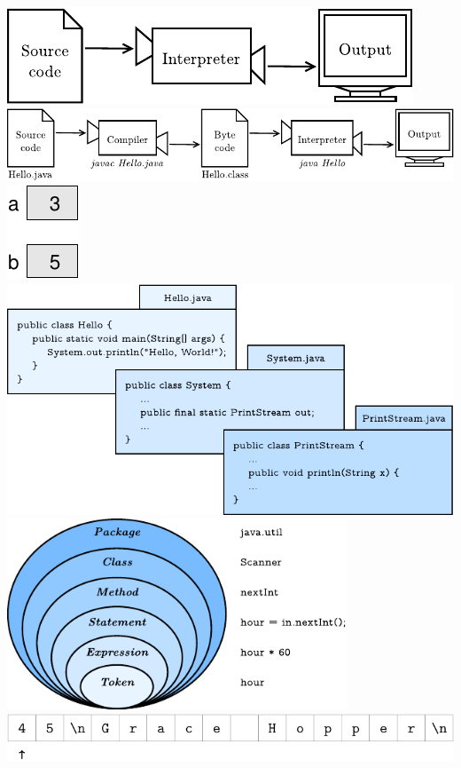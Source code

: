 \documentclass[12pt]{book}
\begin{document}
\includegraphics{./figs/interpreter.pdf}
\clearpage%
\includegraphics{./figs/compiler.pdf}
\clearpage%
\includegraphics{./figs/state.pdf}
\clearpage%
\includegraphics{./figs/system.pdf}
\clearpage%
\includegraphics[width=4in]{./figs/package.pdf}
\clearpage%
\includegraphics{./figs/hopper1.pdf}
\end{document}
